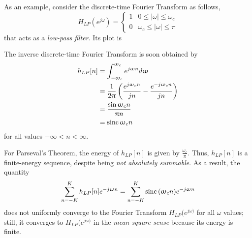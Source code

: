 \documentclass[\documentfontsize, twocolumn]{\classname}
\begin{document}
As an example, consider the discrete-time Fourier Transform as follows,
\[
    H_{LP}(e^{j\omega}) = \left\{\begin{array}{ll}
        1 & 0 \leq |\omega| \leq \omega_c\\
        0 & \omega_c \leq |\omega| \leq \pi
        \end{array}\right.
\]
that acts as a \emph{low-pass filter}. Its plot is
\begin{center}
\end{center}

The inverse discrete-time Fourier Transform is soon obtained by
\begin{align*}
    h_{LP}[n] &= \int_{-\upomega_c}^{\upomega_c} e^{j\upomega n}d\upomega \\
              &= \frac 1 {2\uppi} \left(\frac{e^{j\upomega_c n}}{jn} - \frac{e^{-j\upomega_c n}}{jn}\right)\\
              &= \frac {\sin {\upomega_c n}}{\uppi n}\\
              &= \operatorname{sinc} {\upomega_c n}
\end{align*}
for all values $-\infty < n < \infty$.

For Parseval's Theorem, the energy of $h_{LP}[n]$ is given by $\frac {\omega_c}{\pi}$. Thus, $h_{LP}[n]$ is a finite-energy sequence, despite being \emph{not absolutely summable}. As a result, the quantity
\[
    \sum_{n=-K}^K h_{LP}[n] e^{-j\upomega n} = \sum_{n=-K}^K \operatorname{sinc} {(\upomega_c n)} e^{-j\upomega n}
\]
does not uniformly converge to the Fourier Transform $H_{LP}(e^{j\omega)}$ for all $\omega$ values; still, it converges to $H_{LP}(e^{j\omega)}$ in the \emph{mean-square sense} because its energy is finite.
\end{document}
